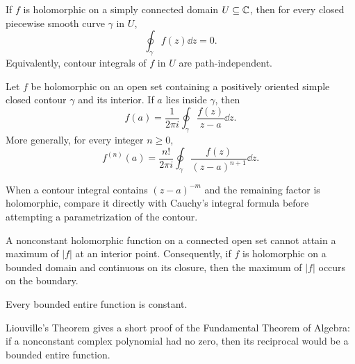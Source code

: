     \begin{theorem}
        If $f$ is holomorphic on a simply connected domain $U\subseteq\mathbb{C}$, then
        for every closed piecewise smooth curve $\gamma$ in $U$,
        \[
            \oint_{\gamma}f(z)\dd z=0.
        \]
        Equivalently, contour integrals of $f$ in $U$ are path-independent.
    \end{theorem}

    \begin{theorem}
        Let $f$ be holomorphic on an open set containing a positively oriented
        simple closed contour $\gamma$ and its interior. If $a$ lies inside
        $\gamma$, then
        \[
            f(a)
            =
            \frac{1}{2\pi i}
            \oint_{\gamma}\frac{f(z)}{z-a}\dd z.
        \]
        More generally, for every integer $n\geq 0$,
        \[
            f^{(n)}(a)
            =
            \frac{n!}{2\pi i}
            \oint_{\gamma}
            \frac{f(z)}{(z-a)^{n+1}}\dd z.
        \]
    \end{theorem}

    \begin{strategy}
        When a contour integral contains $(z-a)^{-m}$ and the remaining factor
        is holomorphic, compare it directly with Cauchy's integral formula before
        attempting a parametrization of the contour.
    \end{strategy}

    \begin{theorem}
        A nonconstant holomorphic function on a connected open set cannot attain
        a maximum of $|f|$ at an interior point. Consequently, if $f$ is
        holomorphic on a bounded domain and continuous on its closure, then the
        maximum of $|f|$ occurs on the boundary.
    \end{theorem}

    \begin{theorem}
        Every bounded entire function is constant.
    \end{theorem}

    \begin{remark}
        Liouville's Theorem gives a short proof of the Fundamental Theorem of
        Algebra: if a nonconstant complex polynomial had no zero, then its
        reciprocal would be a bounded entire function.
    \end{remark}


